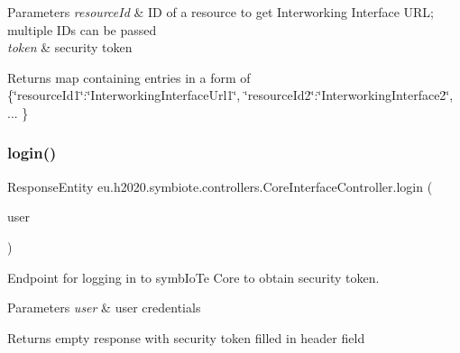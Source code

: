 \begin{DoxyParams}{Parameters}
{\em resource\+Id} & ID of a resource to get Interworking Interface U\+RL; multiple I\+Ds can be passed \\
\hline
{\em token} & security token \\
\hline
\end{DoxyParams}
\begin{DoxyReturn}{Returns}
map containing entries in a form of \{\char`\"{}resource\+Id1\char`\"{}\+:\char`\"{}\+Interworking\+Interface\+Url1\char`\"{}, \char`\"{}resource\+Id2\char`\"{}\+:\char`\"{}\+Interworking\+Interface2\char`\"{}, ... \} 
\end{DoxyReturn}
\mbox{\label{classeu_1_1h2020_1_1symbiote_1_1controllers_1_1CoreInterfaceController_ae47382b47714db8cd0e659b30774355d}} 
\subsubsection{\texorpdfstring{login()}{login()}}
{\footnotesize\ttfamily Response\+Entity eu.\+h2020.\+symbiote.\+controllers.\+Core\+Interface\+Controller.\+login (\begin{DoxyParamCaption}\item[{@Request\+Body Credentials}]{user }\end{DoxyParamCaption})}

Endpoint for logging in to symb\+Io\+Te Core to obtain security token.


\begin{DoxyParams}{Parameters}
{\em user} & user credentials \\
\hline
\end{DoxyParams}
\begin{DoxyReturn}{Returns}
empty response with security token filled in header field 
\end{DoxyReturn}
\mbox{\label{classeu_1_1h2020_1_1symbiote_1_1controllers_1_1CoreInterfaceController_aa3f7d2db7a96024ca0cefdef1dbe13fa}} 
